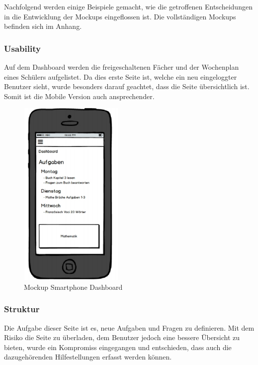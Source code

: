 Nachfolgend werden einige Beispiele gemacht, wie die getroffenen Entscheidungen in die Entwicklung der Mockups eingeflossen ist. Die vollständigen Mockups befinden sich im Anhang.

\subsubsection*{Usability}
Auf dem Dashboard werden die freigeschaltenen Fächer und der Wochenplan eines Schülers aufgelistet. Da dies erste Seite ist, welche ein neu eingeloggter Benutzer sieht, wurde besonders darauf geachtet, dass die Seite übersichtlich ist. Somit ist die Mobile Version auch ansprechender.
\begin{minipage}{\textwidth}
	\begin{figure}[H]
	\centering
		\includegraphics[width=5cm, keepaspectratio]{images/Mockups/Dashboard_Smartphone.png}
		\caption{Mockup Smartphone Dashboard}
	\end{figure}
\end{minipage}


\subsubsection*{Struktur}
Die Aufgabe dieser Seite ist es, neue Aufgaben und Fragen zu definieren. Mit dem Risiko die Seite zu überladen, dem Benutzer jedoch eine bessere Übersicht zu bieten, wurde ein Kompromiss eingegangen und entschieden, dass auch die dazugehörenden Hilfestellungen erfasst werden können. \\

